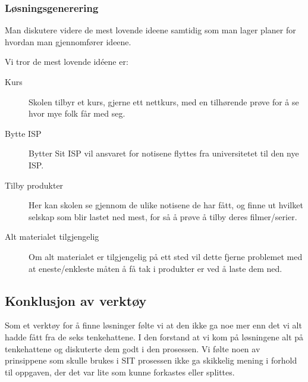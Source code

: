 \subsubsection{Løsningsgenerering} Man diskutere videre de mest lovende ideene samtidig som man lager planer for hvordan man gjennomfører ideene.

Vi tror de mest lovende idéene er:
\begin{description}
    \item [Kurs] Skolen tilbyr et kurs, gjerne ett nettkurs, med en tilhørende prøve for å se hvor mye folk får med seg.
    \item [Bytte ISP] Bytter Sit ISP vil ansvaret for notisene flyttes fra universitetet til den nye ISP. 
    \item [Tilby produkter] Her kan skolen se gjennom de ulike notisene de har fått, og finne ut hvilket selskap som blir lastet ned mest, for så å prøve å tilby deres filmer/serier.
    \item [Alt materialet tilgjengelig] Om alt materialet er tilgjengelig på ett sted vil dette fjerne problemet med at eneste/enkleste måten å få tak i produkter er ved å laste dem ned.
\end{description}


\subsection{Konklusjon av verktøy}
Som et verktøy for å finne løsninger følte vi at den ikke ga noe mer enn det vi alt hadde fått fra de seks tenkehattene. I den forstand at vi kom på løsningene alt på tenkehattene og diskuterte dem godt i den prosessen. Vi følte noen av prinsippene som skulle brukes i SIT prosessen ikke ga skikkelig mening i forhold til oppgaven, der det var lite som kunne forkastes eller splittes.